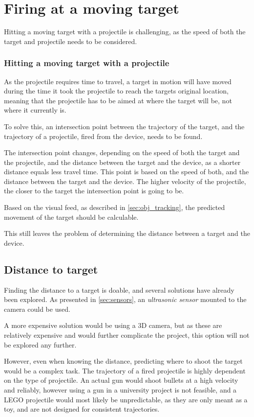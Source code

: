 \section{Firing at a moving target}
Hitting a moving target with a projectile is challenging, as the speed of both the target and projectile needs to be considered.

\subsubsection{Hitting a moving target with a projectile}
As the projectile requires time to travel, a target in motion will have moved during the time it took the projectile to reach the targets original location, meaning that the projectile has to be aimed at where the target will be, not where it currently is.


To solve this, an intersection point between the trajectory of the target, and the trajectory of a projectile, fired from the device, needs to be found.

The intersection point changes, depending on the speed of both the target and the projectile, and the distance between the target and the device, as a shorter distance equals less travel time.
This point is based on the speed of both, and the distance between the target and the device. 
The higher velocity of the projectile, the closer to the target the intersection point is going to be.

Based on the visual feed, as described in \autoref{sec:obj_tracking}, the predicted movement of the target should be calculable.


This still leaves the problem of determining the distance between a target and the device.
\subsection{Distance to target}
Finding the distance to a target is doable, and several solutions have already been explored.
As presented in \autoref{sec:sensors}, an \textit{ultrasonic sensor} mounted to the camera could be used.

A more expensive solution would be using a 3D camera, but as these are relatively expensive and would further complicate the project, this option will not be explored any further.

However, even when knowing the distance, predicting where to shoot the target would be a complex task.
The trajectory of a fired projectile is highly dependent on the type of projectile.
An actual gun would shoot bullets at a high velocity and reliably, however using a gun in a university project is not feasible, and a LEGO projectile would most likely be unpredictable, as they are only meant as a toy, and are not designed for consistent trajectories.


